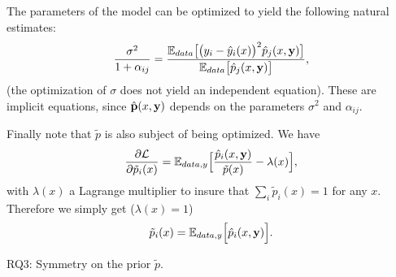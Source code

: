 \documentclass[envcountsect,runningheads]{llncs}
\theoremstyle{etoile}
\begin{document}
The parameters of the model can be optimized to yield the following natural estimates:
\begin{equation}\label{eq:var}
\frac{\sigma^2}{1+\alpha_{ij}} = \frac{{\mathbb E}_{data}\bigl[\bigl(y_i-\hat y_i(x)\bigr)^2\hat p_j(x,{\bf y})\bigr]}{{\mathbb E}_{data}\bigl[\hat p_j(x,{\bf y})\bigr]},
\end{equation}
(the optimization of $\sigma$ does not yield an independent equation).
These are implicit equations, since $\hat {\bf p}(x,{\bf y})$ depends on the parameters $\sigma^2$ and $\alpha_{ij}$.

Finally note that $\tilde p$ is also subject of being optimized. We have
\[
\frac{\partial{\cal L}}{\partial \tilde p_i(x)} = {\mathbb E}_{data,y}\Bigl[\frac{\hat p_i(x,{\bf y})}{\tilde p(x)}-\lambda(x)\Bigr],
\]
with $\lambda(x)$ a Lagrange multiplier to insure that $\sum_i\tilde p_i(x)=1$ for any $x$. Therefore we simply get ($\lambda(x)=1$)
\begin{equation}\label{eq:tildep}
\tilde p_i(x) = {\mathbb E}_{data,y}\Bigl[\hat p_i(x,{\bf y})\Bigr].
\end{equation}

RQ3: Symmetry on the prior $\tilde p$.
\end{document}
